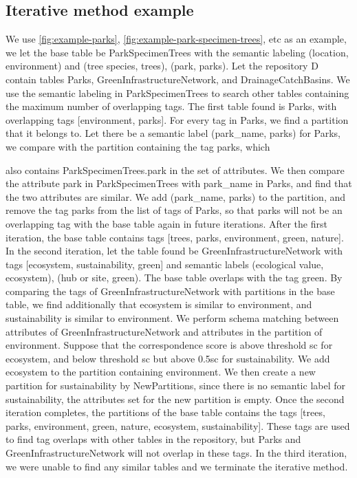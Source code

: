 \subsection{Iterative method example}
\label{ssec:IterativeMethodExample}

We use \autoref{fig:example-parks}, \autoref{fig:example-park-specimen-trees}, etc as an example, we let the base table be ParkSpecimenTrees with the semantic labeling (location, environment) and (tree species, trees), (park, parks). Let the repository D contain tables Parks, GreenInfrastructureNetwork, and DrainageCatchBasins. We use the semantic labeling in ParkSpecimenTrees to search other tables containing the maximum number of overlapping tags. The first table found is Parks, with overlapping tags [environment, parks]. For every tag in Parks, we find a partition that it belongs to. Let there be a semantic label (park\_name, parks) for Parks, we compare with the partition containing the tag parks, which

also contains ParkSpecimenTrees.park in the set of attributes. We then compare the attribute park in ParkSpecimenTrees with park\_name in Parks, and find that the two attributes are similar. We add (park\_name, parks) to the partition, and remove the tag parks from the list of tags of Parks, so that parks will not be an overlapping tag with the base table again in future iterations. After the first iteration, the base table contains tags [trees, parks, environment, green, nature]. In the second iteration, let the table found be GreenInfrastructureNetwork with tags [ecosystem, sustainability, green] and semantic labels {(ecological value, ecosystem), (hub or site, green)}. The base table overlaps with the tag green. By comparing the tags of GreenInfrastructureNetwork with partitions in the base table, we find additionally that ecosystem is similar to environment, and sustainability is similar to environment. We perform schema matching between attributes of GreenInfrastructureNetwork and attributes in the partition of environment. Suppose that the correspondence score is above threshold sc for ecosystem, and below threshold sc but above 0.5sc for sustainability. We add ecosystem to the partition containing environment. We then create a new partition for sustainability by NewPartitions, since there is no semantic label for sustainability, the attributes set for the new partition is empty. Once the second iteration completes, the partitions of the base table contains the tags [trees, parks, environment, green, nature, ecosystem, sustainability]. These tags are used to find tag overlaps with other tables in the repository, but Parks and GreenInfrastructureNetwork will not overlap in these tags. In the third iteration, we were unable to find any similar tables and we terminate the iterative method.

